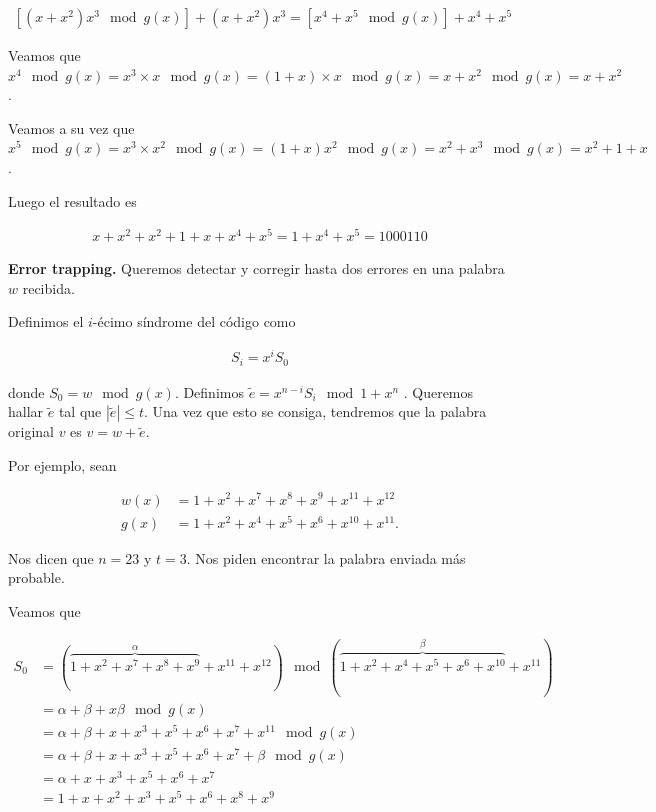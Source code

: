\documentclass[a4paper]{article}
\begin{document}
\begin{align*}
    \left[(x + x^2)x^{3} \mod g(x)\right] + (x+x^2) x^3 = \left[x^4 + x^5 \mod
    g(x)\right] + x^4 + x^5
\end{align*}

Veamos que $x^4 \mod g(x) = x^3 \times x \mod g(x) = (1+x) \times x \mod g(x) =
x + x^2 \mod g(x) = x + x^2$.

Veamos a su vez que $x^5 \mod g(x) = x^3 \times x^2 \mod g(x) = (1+x)x^2 \mod
g(x) = x^2 + x^3 \mod g(x) = x^2 + 1 + x$.

Luego el resultado es 

\begin{align*}
    x + x^2 + x^2 + 1 + x + x^4 + x^5 = 1 + x^4 + x^5 = 1000110
\end{align*}

\textbf{Error trapping.} Queremos detectar y corregir hasta dos errores en una
palabra $w$ recibida. 

Definimos el $i$-écimo síndrome del código como 

\begin{align*}
    S_i = x^i S_0
\end{align*}

donde $S_0 = w \mod g(x)$. Definimos $\tilde{ e } = x^{n-i}S_i \mod 1 + x^n$ .
Queremos hallar $\tilde{ e }$ tal que $|\tilde{ e }| \leq t$. Una vez que esto
se consiga, tendremos que la palabra original $v$ es $v = w + \tilde{ e }$.

Por ejemplo, sean

\begin{align*}
    w(x) &= 1 + x^2 + x^7 + x^8 + x^9 + x^{11} + x^{12}  \\ g(x) &= 1 + x^2 + x^4 + x^5 + x^6 + x^{10} + x^{11}.
\end{align*}

Nos dicen que $n = 23$ y $t = 3$. Nos piden encontrar la palabra enviada más
probable.

Veamos que 

\begin{align*}
    S_0 &= \left( \overbrace{1 + x^2 + x^7 + x^8 + x^9}^{\alpha} + x^{11} + x^{12} \right)  \mod
    \left( \overbrace{1 + x^2 + x^4 + x^5 + x^6 + x^{10}}^{\beta} + x^{11} \right) \\ 
        &= \alpha + \beta + x\beta \mod g(x) \\ 
        &= \alpha + \beta + x + x^3 + x^5 + x^6 + x^7 + x^{11} \mod g(x) \\ 
        &= \alpha + \beta + x + x^3 + x^5 + x^6 + x^7 + \beta \mod g(x) \\ 
        &= \alpha + x + x^3 + x^5 + x^6 + x^7 \\ 
        &= 1 + x + x^2 + x^3 +x^5 + x^6 + x^8 + x^9
\end{align*}
\end{document}

